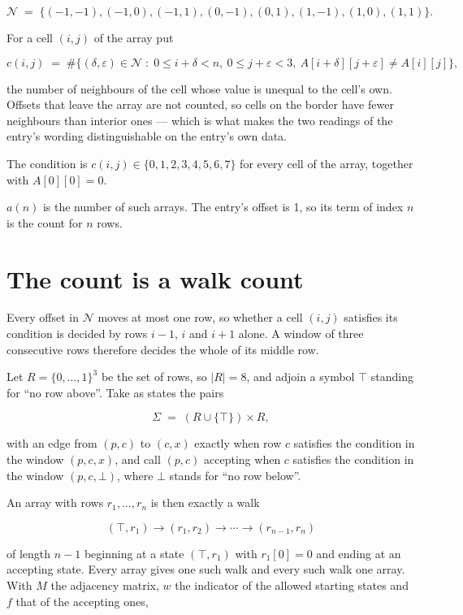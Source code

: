 \documentclass[11pt]{article}
\theoremstyle{definition}
\begin{document}
\[\mathcal{N} \;=\; \{(-1,-1), (-1,0), (-1,1), (0,-1), (0,1), (1,-1), (1,0), (1,1)\}.\]

For a cell $(i,j)$ of the array put

\[c(i,j) \;=\; \#\bigl\{(\delta,\varepsilon)\in\mathcal{N} \;:\; 0\le i+\delta<n,\ 0\le j+\varepsilon<3,\ A[i+\delta][j+\varepsilon] \neq A[i][j]\bigr\},\]

the number of neighbours of the cell whose value is unequal to the cell's own. Offsets that leave the array are not counted, so cells on the border have fewer neighbours than interior ones --- which is what makes the two readings of the entry's wording distinguishable on the entry's own data.

The condition is $c(i,j) \in \{0, 1, 2, 3, 4, 5, 6, 7\}$ for every cell of the array, together with $A[0][0]=0$.

$a(n)$ is the number of such arrays. The entry's offset is 1, so its term of index $n$ is the count for $n$ rows.

\section{The count is a walk count}

Every offset in $\mathcal{N}$ moves at most one row, so whether a cell $(i,j)$ satisfies its condition is decided by rows $i-1$, $i$ and $i+1$ alone. A window of three consecutive rows therefore decides the whole of its middle row.

Let $R = \{0,\dots,1\}^{3}$ be the set of rows, so $|R| = 8$, and adjoin a symbol $\top$ standing for ``no row above''. Take as states the pairs

\[\Sigma \;=\; (R \cup \{\top\}) \times R,\]

with an edge from $(p,c)$ to $(c,x)$ exactly when row $c$ satisfies the condition in the window $(p,c,x)$, and call $(p,c)$ accepting when $c$ satisfies the condition in the window $(p,c,\bot)$, where $\bot$ stands for ``no row below''.

An array with rows $r_1,\dots,r_n$ is then exactly a walk

\[(\top,r_1) \to (r_1,r_2) \to \cdots \to (r_{n-1},r_n)\]

of length $n-1$ beginning at a state $(\top,r_1)$ with $r_1[0]=0$ and ending at an accepting state. Every array gives one such walk and every such walk one array. With $M$ the adjacency matrix, $w$ the indicator of the allowed starting states and $f$ that of the accepting ones,
\end{document}
